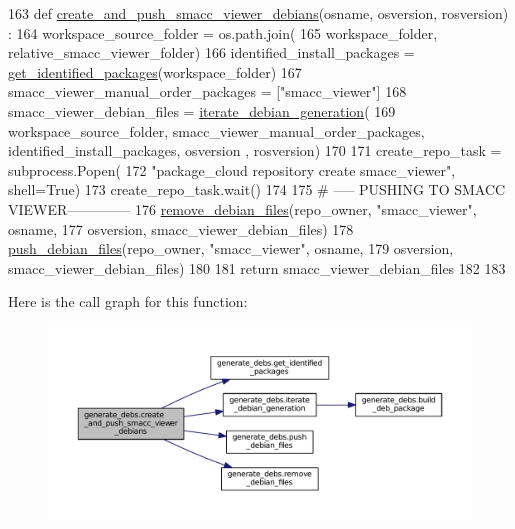 \begin{DoxyCode}
163 \textcolor{keyword}{def }\hyperlink{namespacegenerate__debs_a9a6167ed98fbdc7b1e1c56da5652cf19}{create\_and\_push\_smacc\_viewer\_debians}(osname, osversion, rosversion)
      :
164     workspace\_source\_folder = os.path.join(
165         workspace\_folder, relative\_smacc\_viewer\_folder)
166     identified\_install\_packages = \hyperlink{namespacegenerate__debs_aa91b87c6d9c3ed04015845cc9298431a}{get\_identified\_packages}(workspace\_folder)
167     smacc\_viewer\_manual\_order\_packages = [\textcolor{stringliteral}{"smacc\_viewer"}]
168     smacc\_viewer\_debian\_files = \hyperlink{namespacegenerate__debs_a2615a6fc7860b6aa9e920e6b4d886589}{iterate\_debian\_generation}(
169         workspace\_source\_folder, smacc\_viewer\_manual\_order\_packages, identified\_install\_packages, osversion
      , rosversion)
170 
171     create\_repo\_task = subprocess.Popen(
172         \textcolor{stringliteral}{"package\_cloud repository create smacc\_viewer"}, shell=\textcolor{keyword}{True})
173     create\_repo\_task.wait()
174 
175     \textcolor{comment}{# ----- PUSHING TO SMACC VIEWER--------------}
176     \hyperlink{namespacegenerate__debs_a08095040d038b3613ad0e77fd4e7f60e}{remove\_debian\_files}(repo\_owner, \textcolor{stringliteral}{"smacc\_viewer"},  osname,
177                         osversion, smacc\_viewer\_debian\_files)
178     \hyperlink{namespacegenerate__debs_a9b22f5ad65b40b7903c467eda308e575}{push\_debian\_files}(repo\_owner, \textcolor{stringliteral}{"smacc\_viewer"}, osname,
179                       osversion, smacc\_viewer\_debian\_files)
180 
181     \textcolor{keywordflow}{return} smacc\_viewer\_debian\_files
182 
183 
\end{DoxyCode}


Here is the call graph for this function\+:
\nopagebreak
\begin{figure}[H]
\begin{center}
\leavevmode
\includegraphics[width=350pt]{namespacegenerate__debs_a9a6167ed98fbdc7b1e1c56da5652cf19_cgraph}
\end{center}
\end{figure}



